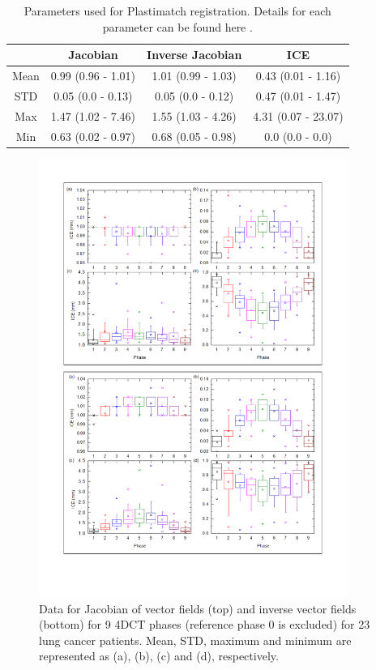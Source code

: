 \documentclass[type=dr, dr=rernat, accentcolor=tud7b,colorbacktitle, bigchapter, openright, twoside, 12pt ]{tudthesis}
\begin{document}
\begin{table}[H]
  \centering
  \caption{Parameters used for Plastimatch registration. Details for each parameter can be found here \cite{Plastimatch}.}
  \begin{tabular}{c|c|c|c}
       & Jacobian & Inverse Jacobian & ICE \\
       \hline
       Mean  & 0.99 (0.96 - 1.01) & 1.01 (0.99 - 1.03) & 0.43 (0.01 - 1.16)\\
       STD   & 0.05 (0.0 - 0.13)  & 0.05 (0.0 - 0.12)  &  0.47 (0.01 - 1.47)\\
       Max   & 1.47 (1.02 - 7.46) & 1.55 (1.03 - 4.26) & 4.31 (0.07 - 23.07)\\
       Min   & 0.63 (0.02 - 0.97) & 0.68 (0.05 - 0.98) & 0.0 (0.0 - 0.0) \\       
      \hline
    \hline\hline
  \end{tabular}
  \label{tab:dirdata_lung}
\end{table}

\newpage

\begin{figure}[H]
	\begin{center}		
		\includegraphics[width=0.9\textwidth]{./Images/Jacobian_data.png}
		\caption{Data for Jacobian of vector fields (top) and inverse vector fields (bottom) for 9 4DCT phases (reference phase 0 is excluded) for 23 lung cancer patients. Mean, STD, maximum and minimum are represented as (a), (b), (c) and (d), respectively.}
		\label{jacobian_data}
	\end{center}
\end{figure}
\end{document}
